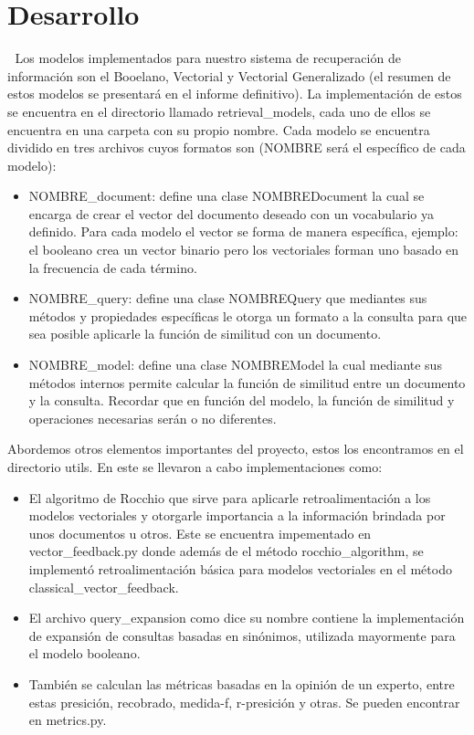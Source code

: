 \documentclass[10pt]{amsart}
\begin{document}
	\section{Desarrollo} \textcolor{white}{.}
	Los modelos implementados para nuestro sistema de recuperación de información son el Booelano, Vectorial y Vectorial Generalizado (el resumen de estos modelos se presentará en el informe definitivo). La implementación de estos se encuentra en el directorio llamado retrieval\_models, cada uno de ellos se encuentra en una carpeta con su propio nombre. Cada modelo se encuentra dividido en tres archivos cuyos formatos son (NOMBRE será el específico de cada modelo):
	\begin{itemize}
		\item NOMBRE\_document: define una clase NOMBREDocument la cual se encarga de crear el vector del documento deseado con un vocabulario ya definido. Para cada modelo el vector se forma de manera específica, ejemplo: el booleano crea un vector binario pero los vectoriales forman uno basado en la frecuencia de cada término. 
		\item NOMBRE\_query: define una clase NOMBREQuery que mediantes sus métodos y propiedades específicas le otorga un formato a la consulta para que sea posible aplicarle la función de similitud con un documento.  
		\item NOMBRE\_model: define una clase NOMBREModel la cual mediante sus métodos internos permite calcular la función de similitud entre un documento y la consulta. Recordar que en función del modelo, la función de similitud y operaciones necesarias serán o no diferentes.  
	\end{itemize}
	Abordemos otros elementos importantes del proyecto, estos los encontramos en el directorio utils. En este se llevaron a cabo implementaciones como: 
	\begin{itemize}
		\item El algoritmo de Rocchio que sirve para aplicarle retroalimentación a los modelos vectoriales y otorgarle importancia a la información brindada por unos documentos u otros. Este se encuentra impementado en vector\_feedback.py donde además de el método rocchio\_algorithm, se implementó retroalimentación básica para modelos vectoriales en el método classical\_vector\_feedback.
		\item El archivo query\_expansion como dice su nombre contiene la implementación de expansión de consultas basadas en sinónimos, utilizada mayormente para el modelo booleano.
		\item También se calculan las métricas basadas en la opinión de un experto, entre estas presición, recobrado, medida-f, r-presición y otras. Se pueden encontrar en metrics.py.
	\end{itemize}
	
	
\end{document}
